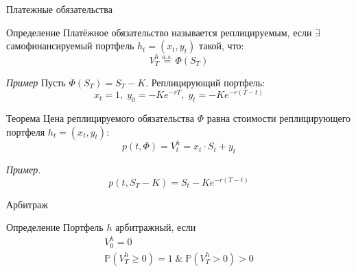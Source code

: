 \documentclass{beamer}
\begin{document}
\begin{frame}{Платежные обязательства}
    \begin{block}{Определение}
        Платёжное обязательство называется реплицируемым, если $\exists$ самофинансируемый портфель $h_t=(x_t, y_t)$ такой, что:
        $$
            V_T^h \overset{a.s.}{=} \Phi(S_T)
        $$
    \end{block}
    \textit{Пример} Пусть $\Phi(S_T) = S_T - K$. Реплицирующий портфель:
    $$
        x_t = 1, \; y_0 = -K e^{-rT}, \; y_t = -K e^{-r(T-t)}
    $$

    \begin{block}{Теорема}
        Цена реплицируемого обязательства $\Phi$ равна стоимости реплицирующего портфеля $h_t=(x_t, y_t)$:
        $$
            p(t, \Phi) = V_t^h = x_t \cdot S_t + y_t
        $$
    \end{block}
    \textit{Пример}.
    $$
        p(t, S_T - K) = S_t - K e^{-r(T-t)}
    $$
    
    
\end{frame}

\begin{frame}{Арбитраж}
    \begin{block}{Определение}
    Портфель $h$ арбитражный, если 
    $$
        \begin{gathered}
            V_0^h = 0 \\
            \mathbb{P}(V_T^h \geq 0) = 1 \; \& \; 
            \mathbb{P}(V_T^h > 0) > 0
        \end{gathered}
    $$
    \end{block}

    
\end{frame}
\end{document}

